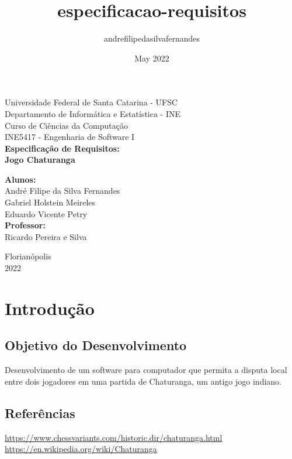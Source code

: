 \documentclass{article}
\title{especificacao-requisitos}
\author{andrefilipedasilvafernandes }
\date{May 2022}
\begin{document}
\begin{titlepage}
\begin{center}
    {\large Universidade Federal de Santa Catarina - UFSC}\\[0.2cm]
    {\large Departamento de Informática e Estatística - INE}\\[0.2cm]
    {\large Curso de Ciências da Computação}\\[0.2cm]
    {\large INE5417 - Engenharia de Software I}\\[5.1cm]
    {\bf \huge Especificação de Requisitos: \\ Jogo Chaturanga}\\[5.1cm]
\end{center}

\begin{flushright}
    {\bf \large  Alunos:} \\
        André Filipe da Silva Fernandes \\
        Gabriel Holstein Meireles \\
        Eduardo Vicente Petry \\
    [0.7cm]
        
    {\bf \large Professor:}\\
        Ricardo Pereira e Silva \\
    [0.7cm]
\end{flushright}

\begin{center}
    {\large Florianópolis}\\[0.2cm]
    {\large 2022}
\end{center}

\end{titlepage} %
\pagebreak

\section{Introdução}
\subsection{Objetivo do Desenvolvimento}
    Desenvolvimento de um software para computador que permita a disputa local entre dois jogadores em uma partida de Chaturanga, um antigo jogo indiano.

\subsection{Referências}
    \url{https://www.chessvariants.com/historic.dir/chaturanga.html} \\
    \url{https://en.wikipedia.org/wiki/Chaturanga} \\
    
\end{document}
